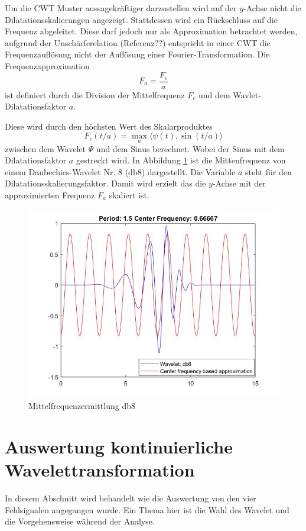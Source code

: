 \begin{refsection}
Um die CWT Muster aussagekräftiger darzustellen wird auf der $y$-Achse nicht die Dilatationsskalierungen angezeigt. Stattdessen wird ein Rückschluss auf die Frequenz abgeleitet. Diese darf jedoch nur als Approximation betrachtet werden, aufgrund der Unschärferelation (Referenz??) entspricht in einer CWT die Frequenzauflösung nicht der Auflösung einer Fourier-Transformation. 
Die Frequenzapproximation 
\begin{equation}
F_a=\dfrac{F_c}{a}
\end{equation}
ist definiert durch die Division der Mittelfrequenz $F_c$ und dem Wavlet-Dilatationsfaktor $a$.

Diese wird durch den höchsten Wert des Skalarproduktes 
\begin{equation}
F_c(t/a) = \max_a\langle \psi(t),\sin (t/a)\rangle
\end{equation}
zwischen dem Wavelet $\Psi$ und dem Sinus berechnet.
Wobei der Sinus mit dem Dilatationsfaktor $a$ gestreckt wird.
In Abbildung \ref{fig:Mittenfrequ} ist die Mittenfrequenz von einem Daubechies-Wavelet Nr. 8 (db8) dargestellt.
Die Variable $a$ steht für den Dilatationsskalierungsfaktor. 
Damit wird erzielt das die $y$-Achse mit der approximierten Frequenz $F_a$ skaliert ist.

\begin{figure}
	\centering
	\includegraphics [width=0.7\linewidth] {papers/gis/Bilder/Mittenfrequenz}
	\caption{Mittelfrequenzermittlung db8}
	\label{fig:Mittenfrequ}
\end{figure}


\section{Auswertung kontinuierliche Wavelettransformation}
In diesem Abschnitt wird behandelt wie die Auswertung von den vier Fehlsignalen angegangen wurde. 
Ein Thema hier ist die Wahl des Wavelet und die Vorgehensweise während der Analyse. 


\end{refsection}

